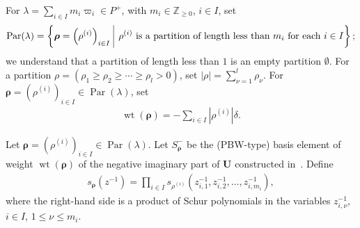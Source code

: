 \documentclass[10pt]{amsart}
\theoremstyle{definition}\newtheorem{defi}[theo]{Definition}
\theoremstyle{remark}\newtheorem{rema}[theo]{Remark}
\newcommand{\BZ}{\mathbb{Z}}
\newcommand\bmrho[1]{\boldsymbol{#1}}
\newcommand{\U}{\mathbf{U}}
\DeclareMathOperator{\wt}{wt}
\DeclareMathOperator{\Par}{Par}
\begin{document}
For 
$\lambda = \sum_{i \in I} m_i \varpi_i \in P^+$, 
with 
$m_i \in \BZ_{\geq 0}$, $i \in I$, 
set 
\begin{align} \label{eq:Par}
\Par (\lambda) = \left\{ \bmrho{\rho} = \left( \rho^{(i)} \right)_{i \in I} \ \vline \ 
\rho^{(i)} \ \text{is a partition of length less than} \ m_i \ \text{for each} \ i \in I \right\} ;
\end{align}
we understand that a partition of length less than $1$ is an empty partition $\emptyset$. 
For a partition $\rho = (\rho_1 \geq \rho_2 \geq \cdots \geq \rho_l > 0)$, 
set 
$|\rho| = \sum_{\nu = 1}^l \rho_{\nu}$.
For 
$\bmrho{\rho} = \left( \rho^{(i)} \right)_{i \in I} \in \Par (\lambda)$, 
set 
\begin{align}
\wt (\bmrho{\rho}) = -\sum_{i \in I} \left| \rho^{(i)} \right| \delta .
\end{align}

Let $\bmrho{\rho} = \left( \rho^{(i)} \right)_{i \in I} \in \Par (\lambda)$. 
Let
$S_{\bmrho{\rho}}^-$
be the (PBW-type) basis element 
of weight $\wt (\bmrho{\rho})$ 
of the negative imaginary part of $\U$ 
constructed in~\cite[the element $S_{\mathbf{c}_0}^-$ in \S~3.1; see also Remark~4.1]{BN04}.
Define
\begin{align} \label{eq:Schur}
s_{\bmrho{\rho}}(z^{-1})
=
\prod_{i \in I} s_{\rho^{(i)}} ( z_{i,1}^{-1} , z_{i,2}^{-1} , \ldots , z_{i,m_i}^{-1} ),
\end{align}
where the right-hand side is a product of Schur polynomials in the variables 
$z_{i,\nu}^{-1}$, $i \in I$, $1 \leq \nu \leq m_i$.
\end{document}
